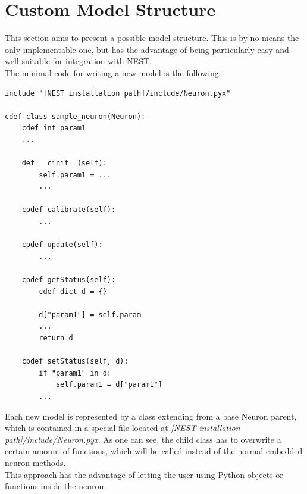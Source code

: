 \documentclass{article}
\begin{document}
\section{Custom Model Structure}
This section aims to present a possible model structure. This is by no means the only implementable one, but has the advantage of being particularly easy and well suitable for integration with NEST.\\
The minimal code for writing a new model is the following:
\begin{verbatim}
include "[NEST installation path]/include/Neuron.pyx"

cdef class sample_neuron(Neuron):
    cdef int param1
    ...

    def __cinit__(self):
        self.param1 = ...
        ...

    cpdef calibrate(self):
        ...

    cpdef update(self):
        ...

    cpdef getStatus(self):
        cdef dict d = {}

        d["param1"] = self.param
        ...
        return d

    cpdef setStatus(self, d):
        if "param1" in d:
            self.param1 = d["param1"]
        ...

\end{verbatim}
Each new model is represented by a class extending from a base Neuron parent, which is contained in a special file located at \emph{[NEST installation path]/include/Neuron.pyx}.
As one can see, the child class has to overwrite a certain amount of functions, which will be called instead of the normal embedded neuron methods.\\
This approach has the advantage of letting the user using Python objects or functions inside the neuron.
\end{document}
